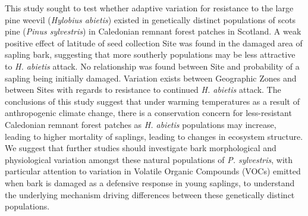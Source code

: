 \documentclass[a4paper, 11pt]{article}
\begin{document}
This study sought to test whether adaptive variation for resistance to the large pine weevil (\textit{Hylobius abietis}) existed in genetically distinct populations of scots pine (\textit{Pinus sylvestris}) in Caledonian remnant forest patches in Scotland. A weak positive effect of latitude of seed collection Site was found in the damaged area of sapling bark, suggesting that more southerly populations may be less attractive to \textit{H. abietis} attack. No relationship was found between Site and probability of a sapling being initially damaged. Variation exists between Geographic Zones and between Sites with regards to resistance to continued \textit{H. abietis} attack. The conclusions of this study suggest that under warming temperatures as a result of anthropogenic climate change, there is a conservation concern for less-resistant Caledonian remnant forest patches as \textit{H. abietis} populations may increase, leading to higher mortality of saplings, leading to changes in ecosystem structure. We suggest that further studies should investigate bark morphological and physiological variation amongst these natural populations of \textit{P. sylvestris}, with particular attention to variation in Volatile Organic Compounds (VOCs) emitted when bark is damaged as a defensive response in young saplings, to understand the underlying mechanism driving differences between these genetically distinct populations.



\end{document}
